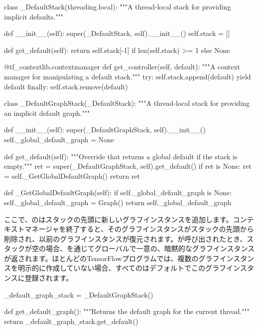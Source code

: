 \begin{content}
\begin{leftbar}
\begin{python}
class _DefaultStack(threading.local):
  """A thread-local stack for providing implicit defaults."""

  def __init__(self):
    super(_DefaultStack, self).__init__()
    self.stack = []

  def get_default(self):
    return self.stack[-1] if len(self.stack) >= 1 else None

  @tf_contextlib.contextmanager
  def get_controller(self, default):
    """A context manager for manipulating a default stack."""
    try:
      self.stack.append(default)
      yield default
    finally:
      self.stack.remove(default)

class _DefaultGraphStack(_DefaultStack):
  """A thread-local stack for providing an implicit default graph."""

  def __init__(self):
    super(_DefaultGraphStack, self).__init__()
    self._global_default_graph = None

  def get_default(self):
    """Override that returns a global default if the stack is empty."""
    ret = super(_DefaultGraphStack, self).get_default()
    if ret is None:
      ret = self._GetGlobalDefaultGraph()
    return ret

  def _GetGlobalDefaultGraph(self):
    if self._global_default_graph is None:
      self._global_default_graph = Graph()
    return self._global_default_graph
\end{python}
\end{leftbar}

ここで、のはスタックの先頭に新しいグラフインスタンスを追加します。コンテキストマネージャを終了すると、そのグラフインスタンスがスタックの先頭から削除され、以前のグラフインスタンスが復元されます。が呼び出されたとき、スタックが空の場合、を通じてグローバルで一意の、暗黙的なグラフインスタンスが返されます。ほとんどのTensorFlowプログラムでは、複数のグラフインスタンスを明示的に作成していない場合、すべてのはデフォルトでこのグラフインスタンスに登録されます。

\begin{leftbar}
\begin{python}
_default_graph_stack = _DefaultGraphStack()

def get_default_graph():
  """Returns the default graph for the current thread."""
  return _default_graph_stack.get_default()


\end{python}
\end{leftbar}
\end{content}
